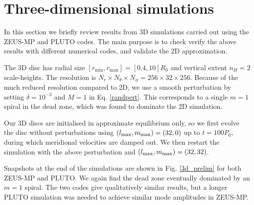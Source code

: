 \section{Three-dimensional simulations}
In this section we briefly review results from 3D simulations carried 
out using the ZEUS-MP and PLUTO codes. The main purpose is to check
verify the above results with different numerical codes, and validate 
the 2D approximation.    

The 3D disc has radial size
$[r_\mathrm{min},r_\mathrm{max}]=[0.4,10]R_0$ and vertical extent 
$n_H=2$ scale-heights. The resolution is $N_r\times N_\theta\times
N_\phi=256\times32\times256$. Because of the much reduced resolution
compared to 2D, we use a smooth perturbation by setting
$\delta = 10^{-3}$ and $M=1$ in Eq. \ref{randpert}. This corresponds
to a single $m=1$ spiral in the dead zone, which was found to dominate
the 2D simulation.  

Our 3D discs are initialised in approximate equilibrium only, so we
first evolve the disc without perturbations using  
$(l_\mathrm{max},m_\mathrm{max})=(32,0)$ up to $t=100P_0$, during which 
meridional velocities are damped out. We then restart the simulation
with the above perturbation and $(l_\mathrm{max},m_\mathrm{max})=(32,32)$. 





Snapshots at the end of the simulations are shown in
Fig. \ref{3d_prelim} for both ZEUS-MP and PLUTO. We again find the dead zone eventually
dominated by an $m=1$ spiral. %
The two codes give qualitatively similar results, but a longer PLUTO simulation was
needed to achieve similar mode amplitudes in ZEUS-MP. 


